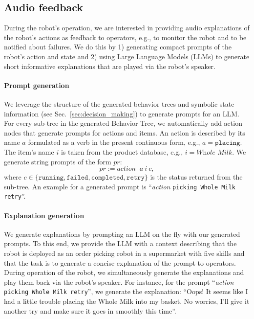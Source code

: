 \subsection{Audio feedback}
\label{sec:language_feedback}

During the robot's operation, we are interested in providing audio explanations of the robot's actions as feedback to operators, e.g., to monitor the robot and to be notified about failures. 
We do this by 1) generating compact prompts of the robot's action and state and 2) using Large Language Models (LLMs) to generate short informative explanations that are played via the robot's speaker.


\paragraph{Prompt generation}
We leverage the structure of the generated behavior trees and symbolic state information (see Sec.~\ref{sec:decision_making}) to generate prompts for an LLM. 
For every sub-tree in the generated Behavior Tree, we automatically add action nodes that generate prompts for actions and items.
An action is described by its name $a$ formulated as a verb in the present continuous form, e.g., $a=\texttt{placing}$.
The item's name $i$ is taken from the product database, e.g., $i=\textit{Whole Milk}$.
We generate string prompts of the form $pr$:
\begin{equation*}
    pr := \textit{action }~a~i~c,
\end{equation*}
where $c\in\{\texttt{running},\texttt{failed}, \texttt{completed}, \texttt{retry}\}$ is the status returned from the sub-tree.
An example for a generated prompt is ``\textit{action }\texttt{picking }\texttt{Whole Milk }\texttt{retry}''.


\paragraph{Explanation generation}
We generate explanations by prompting an LLM on the fly with our generated prompts. 
To this end, we provide the LLM with a context describing that the robot is deployed as an order picking robot in a supermarket with five skills and that the task is to generate a concise explanation of the prompt to operators. 
During operation of the robot, we simultaneously generate the explanations and play them back via the robot's speaker.
For instance, for the prompt  ``\textit{action }\texttt{picking }\texttt{Whole Milk }\texttt{retry}'', we generate the explanation: ``Oops! It seems like I had a little trouble placing the Whole Milk into my basket. No worries, I'll give it another
  try and make sure it goes in smoothly this time''.


